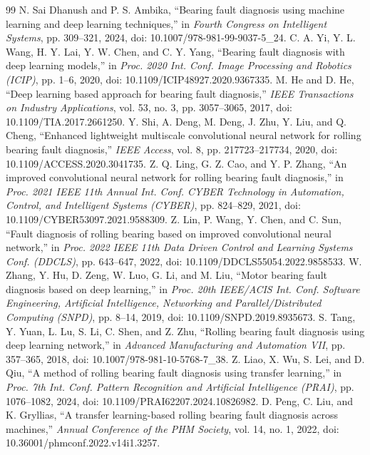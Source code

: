 \documentclass[machines,article,submit,oneauthor,pdftex]{Definitions/mdpi}
\begin{document}
\begin{thebibliography}{99}
 N. Sai Dhanush and P. S. Ambika, ``Bearing fault diagnosis using machine learning and deep learning techniques,'' in \emph{Fourth Congress on Intelligent Systems}, pp. 309--321, 2024, doi: 10.1007/978-981-99-9037-5\_24.
 C. A. Yi, Y. L. Wang, H. Y. Lai, Y. W. Chen, and C. Y. Yang, ``Bearing fault diagnosis with deep learning models,'' in \emph{Proc. 2020 Int. Conf. Image Processing and Robotics (ICIP)}, pp. 1--6, 2020, doi: 10.1109/ICIP48927.2020.9367335.
 M. He and D. He, ``Deep learning based approach for bearing fault diagnosis,'' \emph{IEEE Transactions on Industry Applications}, vol. 53, no. 3, pp. 3057--3065, 2017, doi: 10.1109/TIA.2017.2661250.
 Y. Shi, A. Deng, M. Deng, J. Zhu, Y. Liu, and Q. Cheng, ``Enhanced lightweight multiscale convolutional neural network for rolling bearing fault diagnosis,'' \emph{IEEE Access}, vol. 8, pp. 217723--217734, 2020, doi: 10.1109/ACCESS.2020.3041735.
 Z. Q. Ling, G. Z. Cao, and Y. P. Zhang, ``An improved convolutional neural network for rolling bearing fault diagnosis,'' in \emph{Proc. 2021 IEEE 11th Annual Int. Conf. CYBER Technology in Automation, Control, and Intelligent Systems (CYBER)}, pp. 824--829, 2021, doi: 10.1109/CYBER53097.2021.9588309.
 Z. Lin, P. Wang, Y. Chen, and C. Sun, ``Fault diagnosis of rolling bearing based on improved convolutional neural network,'' in \emph{Proc. 2022 IEEE 11th Data Driven Control and Learning Systems Conf. (DDCLS)}, pp. 643--647, 2022, doi: 10.1109/DDCLS55054.2022.9858533.
 W. Zhang, Y. Hu, D. Zeng, W. Luo, G. Li, and M. Liu, ``Motor bearing fault diagnosis based on deep learning,'' in \emph{Proc. 20th IEEE/ACIS Int. Conf. Software Engineering, Artificial Intelligence, Networking and Parallel/Distributed Computing (SNPD)}, pp. 8--14, 2019, doi: 10.1109/SNPD.2019.8935673.
 S. Tang, Y. Yuan, L. Lu, S. Li, C. Shen, and Z. Zhu, ``Rolling bearing fault diagnosis using deep learning network,'' in \emph{Advanced Manufacturing and Automation VII}, pp. 357--365, 2018, doi: 10.1007/978-981-10-5768-7\_38.
 Z. Liao, X. Wu, S. Lei, and D. Qiu, ``A method of rolling bearing fault diagnosis using transfer learning,'' in \emph{Proc. 7th Int. Conf. Pattern Recognition and Artificial Intelligence (PRAI)}, pp. 1076--1082, 2024, doi: 10.1109/PRAI62207.2024.10826982.
 D. Peng, C. Liu, and K. Gryllias, ``A transfer learning-based rolling bearing fault diagnosis across machines,'' \emph{Annual Conference of the PHM Society}, vol. 14, no. 1, 2022, doi: 10.36001/phmconf.2022.v14i1.3257.

\end{thebibliography}
\end{document}
